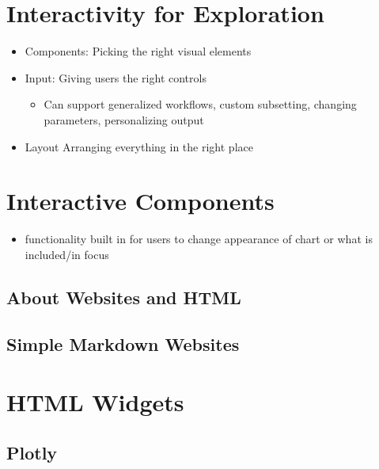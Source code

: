 \documentclass[
]{krantz}
\providecommand{\tightlist}{%
  \setlength{\itemsep}{0pt}\setlength{\parskip}{0pt}}
\begin{document}
\hypertarget{interactivity-for-exploration}{%
\section{Interactivity for Exploration}\label{interactivity-for-exploration}}

\begin{itemize}
\tightlist
\item
  Components: Picking the right visual elements
\item
  Input: Giving users the right controls

  \begin{itemize}
  \tightlist
  \item
    Can support generalized workflows, custom subsetting, changing parameters, personalizing output
  \end{itemize}
\item
  Layout Arranging everything in the right place
\end{itemize}

\hypertarget{interactive-components}{%
\section{Interactive Components}\label{interactive-components}}

\begin{itemize}
\tightlist
\item
  functionality built in for users to change appearance of chart or what is included/in focus
\end{itemize}

\hypertarget{about-websites-and-html}{%
\subsection{About Websites and HTML}\label{about-websites-and-html}}

\hypertarget{simple-markdown-websites}{%
\subsection{Simple Markdown Websites}\label{simple-markdown-websites}}

\hypertarget{html-widgets}{%
\section{HTML Widgets}\label{html-widgets}}

\hypertarget{plotly}{%
\subsection{Plotly}\label{plotly}}
\end{document}
